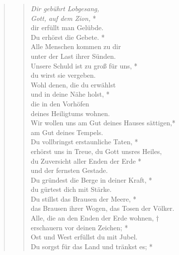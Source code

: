 \vspace{0.6cm}
\def\greinitialformat#1{{\fontsize{40}{40}\selectfont #1}}
\gresetfirstlineaboveinitial{\small \textcolor{red}{Ps 65}}{}
\setaboveinitialseparation{0.72mm}

\vspace{0.6cm}

\begin{quote}
\begin{verse}
\textit{Dir gebührt Lobgesang,\\
Gott, auf dem Zion,} *\\
dir erfüllt man Gelübde.\\ 
\vin Du erhörst die Gebete. *\\ 
\vin Alle Menschen kommen zu dir\\ 
\vin unter der Last ihrer Sünden.\\ 
Unsere Schuld ist zu groß für uns, *\\
du wirst sie vergeben.\\ 
\vin Wohl denen, die du erwählst\\ 
\vin und in deine Nähe holst, *\\ 
\vin die in den Vorhöfen\\ 
\vin deines Heiligtums wohnen.\\ 
Wir wollen uns am Gut deines Hauses sättigen,*\\ 
am Gut deines Tempels.\\ 
\vin Du vollbringst erstaunliche Taten, *\\ 
\vin erhörst uns in Treue, du Gott unsres Heiles,\\
du Zuversicht aller Enden der Erde *\\ 
und der fernsten Gestade.\\ 
\vin Du gründest die Berge in deiner Kraft, *\\ 
\vin du gürtest dich mit Stärke.\\
Du stillst das Brausen der Meere, *\\
das Brausen ihrer Wogen, das Tosen der Völker.\\ 
\vin Alle, die an den Enden der Erde wohnen, †\\ 
\vin erschauern vor deinen Zeichen; *\\ 
\vin Ost und West erfüllst du mit Jubel.\\
Du sorgst für das Land und tränkst es; *\\

\end{verse}
\end{quote}
